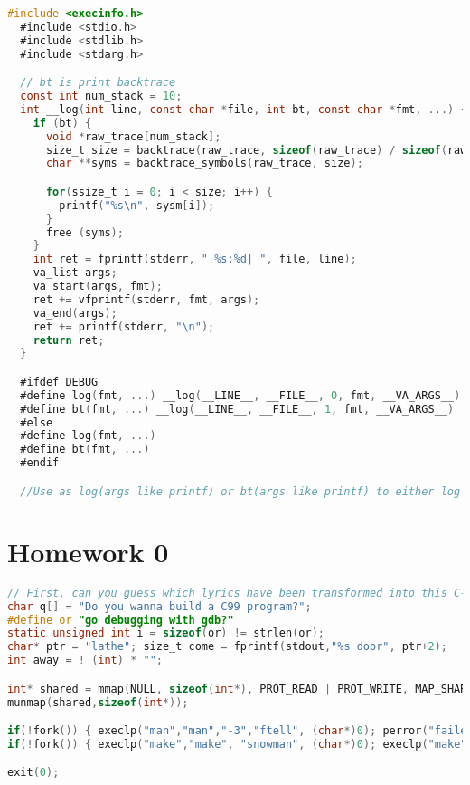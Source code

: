 \begin{lstlisting}[language=C]
  #include <execinfo.h>
  #include <stdio.h>
  #include <stdlib.h>
  #include <stdarg.h>

  // bt is print backtrace
  const int num_stack = 10;
  int __log(int line, const char *file, int bt, const char *fmt, ...) {
    if (bt) {
      void *raw_trace[num_stack];
      size_t size = backtrace(raw_trace, sizeof(raw_trace) / sizeof(raw_trace[0]));
      char **syms = backtrace_symbols(raw_trace, size);

      for(ssize_t i = 0; i < size; i++) {
        printf("%s\n", sysm[i]);
      }
      free (syms); 
    }
    int ret = fprintf(stderr, "|%s:%d| ", file, line);
    va_list args;
    va_start(args, fmt); 
    ret += vfprintf(stderr, fmt, args);
    va_end(args);
    ret += printf(stderr, "\n");
    return ret;
  }

  #ifdef DEBUG
  #define log(fmt, ...) __log(__LINE__, __FILE__, 0, fmt, __VA_ARGS__)
  #define bt(fmt, ...) __log(__LINE__, __FILE__, 1, fmt, __VA_ARGS__)
  #else
  #define log(fmt, ...)
  #define bt(fmt, ...)
  #endif

  //Use as log(args like printf) or bt(args like printf) to either log or get backtrace
\end{lstlisting}

\newpage

\section{Homework 0} 

\begin{lstlisting}[language=C]
// First, can you guess which lyrics have been transformed into this C-like system code?
char q[] = "Do you wanna build a C99 program?";
#define or "go debugging with gdb?"
static unsigned int i = sizeof(or) != strlen(or);
char* ptr = "lathe"; size_t come = fprintf(stdout,"%s door", ptr+2);
int away = ! (int) * "";

int* shared = mmap(NULL, sizeof(int*), PROT_READ | PROT_WRITE, MAP_SHARED | MAP_ANONYMOUS, -1, 0);
munmap(shared,sizeof(int*));

if(!fork()) { execlp("man","man","-3","ftell", (char*)0); perror("failed"); }
if(!fork()) { execlp("make","make", "snowman", (char*)0); execlp("make","make", (char*)0)); }

exit(0);
\end{lstlisting}

